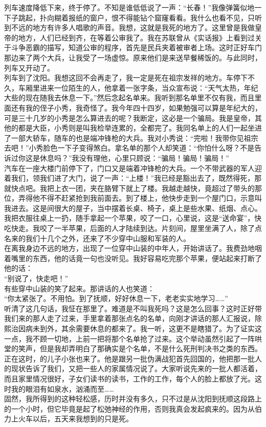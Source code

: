 列车速度降低下来，终于停了。不知是谁低低说了一声：“长春！”我像弹簧似地一下子跳起，扑向糊着报纸的窗户，恨不得能钻个窟窿看看。我什么也看不见，只听到不远的地方有许多人唱歌的声音。我想，这就是我死的地方了。这里曾是我做皇帝的地方，人们已经到齐，在等着公审我了。我在苏联曾从《实话报》上看到过关于斗争恶霸的描写，知道公审的程序，首先是民兵夹着被审者上场。这时正好车门那边来了两个大兵，让我受了一场虚惊。原来他们是来送早餐稀饭的。与此同时，列车又开动了。\\

列车到了沈阳。我想这回不会再走了，我一定是死在祖宗发祥的地方。车停下不久，车厢里进来一位陌生的人，他拿着一张字条，当众宣布说：“天气太热，年纪大些的现在随我去休息一下。”然后念起名单来。我听到那名单里不仅有我，而且里面还有我的侄子小秀，我奇怪了。我今年四十四岁，如果勉强可以算是年纪大的，可是三十几岁的小秀是怎么算进去的呢？我断定，这必是一个骗局。我是皇帝，其他的都是大臣，小秀则是叫我检举连累的，全都完了。我同名单上的人们一起坐进了一部大轿车，随车的也是端冲锋枪的大兵。我对小秀说：“完啦！我带你见祖宗去吧！”小秀脸色一下子变得煞白。拿名单的那个人却笑道：“你怕什么呀？不是告诉过你这是休息吗？”我没有理他，心里只顾说：“骗局！骗局！骗局！”\\

汽车在一座大楼门前停下了，门口又是端着冲锋枪的大兵。一个不带武器的军人迎着我们，领我们进了大门，说了一声：“上楼！”我已经是豁出去了，既然得死，那就快点吧。我把上衣一团，夹在胳臂下就上了楼。我越走越快，竟超过了带头的那位，弄得他不得不赶紧抢到我前面去。到了楼上，他快步走到一个屋门口，示意叫我进去。这是间很大的屋子，当中摆着长桌、椅子，桌上是些水果、纸烟、点心。我把衣服往桌上一扔，随手拿起一个苹果，咬了一口，心里说，这是“送命宴”，快吃快走。我咬了一半苹果，后面的人才陆续到达。片刻间，屋里坐满了人，除了点名来的我们十几个之外，还来了不少穿中山服和军装的人。\\

在离我身边不远的地方，出现了一位穿中山装的中年人，开始讲话了。我费劲地咽着嘴里的东西，他的话竟一句也没听见。我好容易吃完那个苹果，便站起来打断了他的话：\\

“别说了，快走吧！”\\

有些穿中山装的笑了起来。那讲话的人也笑道：\\

“你太紧张了。不用怕。到了抚顺，好好休息一下，老老实实地学习……”\\

听清了这几句话，我怔在那里了。难道是不叫我死吗？这是怎么回事？这时正好带我们来的那人走了过来，手里拿着那张点名的名单，向刚才讲话的那人汇报说，除熙治因病未到外，其余需要休息的都来了。我一听，这更不是瞎猎了。为了证实这一点，我不顾一切地，上前一把将那个名单抢了过来。这个举动虽然引起了一阵哄堂的笑声，但是我却弄明白了那确实是个名单，不是什么死刑判决书之类的东西。正在这时，的儿子小张也来了。他是跟另一批伪满战犯首先回国的，他把那一批人的现状告诉了我们，又把一些人的家属情况说了。大家听说先来的一批人都活着，而且家里情况很好，子女们读书的读书，工作的工作，每个人的脸上都放了光。这时我的眼泪有如泉水，汹涌而至……\\

固然，我所得到的这种轻松感，历时并没有多久，只不过是从沈阳到抚顺这段路上的一个小时，但它毕竟是起了松弛神经的作用，否则我真会发起疯来的。因为从伯力上火车以后，五天来我想到的只是死。
